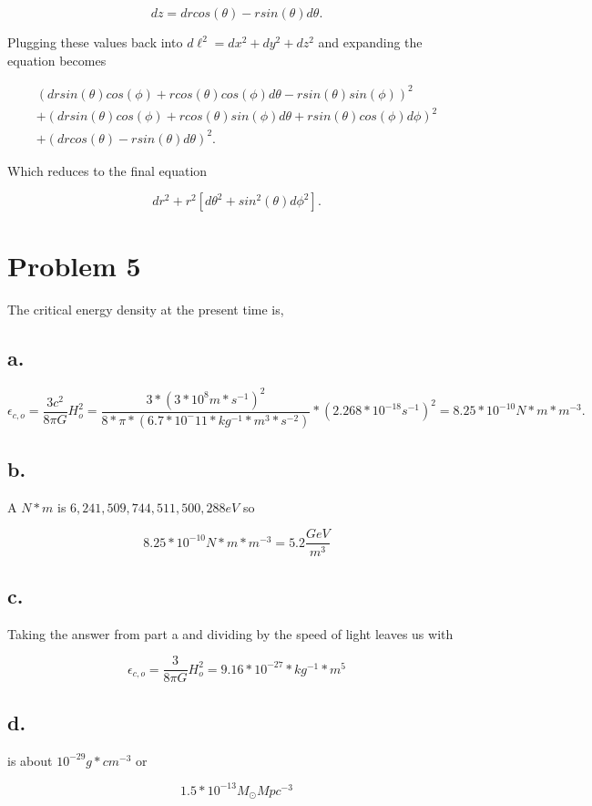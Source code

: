 \documentclass[12pt]{article}
\begin{document}
$$
dz = drcos(\theta) - rsin(\theta)d\theta.
$$

Plugging these values back into $d\ell^{2} = dx^{2} + dy^{2} + dz^{2}$ and expanding the equation becomes

\begin{align*}
(drsin(\theta)cos(\phi) + rcos(\theta)cos(\phi)d\theta - rsin(\theta)sin(\phi))^{2} \\
+ (drsin(\theta)cos(\phi) + rcos(\theta)sin(\phi)d\theta + rsin(\theta)cos(\phi)d\phi)^{2} \\
+ (drcos(\theta) - rsin(\theta)d\theta)^{2}.
\end{align*}


Which reduces to the final equation 

$$
dr^{2} + r^{2}[d\theta^{2} + sin^{2}(\theta)d\phi^{2}].
$$

\section*{Problem 5}

The critical energy density at the present time is,


\subsection*{a.}

$$
\epsilon_{c,o} = \frac{3c^{2}}{8 \pi G} H_{o}^{2} = \frac{3*(3*10^8m*s^{-1})^2}{8*\pi*(6.7*10^-11*kg^{-1}*m^{3}*s^{-2})}*(2.268*10^{-18}s^{-1})^2 = 8.25*10^{-10}N*m*m^{-3}.
$$


\subsection*{b.}

A $N*m$ is $6,241,509,744,511,500,288 eV$ so 

$$
8.25*10^{-10}N*m*m^{-3} = 5.2 \frac{GeV}{m^3}
$$


\subsection*{c.}

Taking the answer from part a and dividing by the speed of light leaves us with 

$$
\epsilon_{c,o} = \frac{3}{8 \pi G} H_{o}^{2} = 9.16 * 10^{-27}*kg^{-1}*m^{5}
$$

\subsection*{d.}

is about $10^{-29} g*cm^{-3}$ or 

$$
1.5*10^{-13} M_\odot Mpc^{-3}
$$




 
\end{document}
